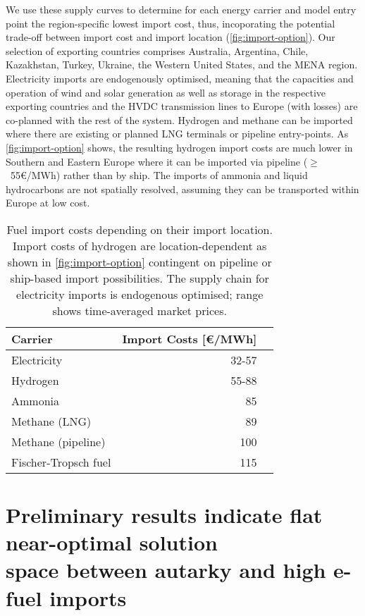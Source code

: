 \documentclass[10pt,5p,reversenotenum,lefttitle]{elsarticle}
\begin{document}
We use these supply curves to determine for each energy carrier and model entry
point the region-specific lowest import cost, thus, incoporating the potential
trade-off between import cost and import location (\cref{fig:import-option}).
Our selection of exporting countries comprises Australia, Argentina, Chile,
Kazakhstan, Turkey, Ukraine, the Western United States, and the MENA region.
Electricity imports are endogenously optimised, meaning that the capacities and
operation of wind and solar generation as well as storage in the respective
exporting countries and the HVDC transmission lines to Europe (with losses) are
co-planned with the rest of the system. Hydrogen and methane can be imported
where there are existing or planned LNG terminals or pipeline entry-points. As
\cref{fig:import-option} shows, the resulting hydrogen import costs are much
lower in Southern and Eastern Europe where it can be imported via pipeline
\mbox{($\geq$ 55\euro/MWh)} rather than by ship. The imports of ammonia and
liquid hydrocarbons are not spatially resolved, assuming they can be transported
within Europe at low cost.

\begin{table}
    \centering\small
    \begin{tabular}[pos]{lrr}
        \toprule
        Carrier & Import Costs [\euro/MWh] \\
        \midrule
        Electricity & 32-57 \\
        Hydrogen & 55-88 \\
        Ammonia & 85 \\ 
        Methane (LNG) & 89 \\
        Methane (pipeline) & 100 \\
        Fischer-Tropsch fuel & 115 \\
        \bottomrule
    \end{tabular}
    \caption{Fuel import costs depending on their import location. Import costs
    of hydrogen are location-dependent as shown in \cref{fig:import-option}
    contingent on pipeline or ship-based import possibilities. The supply chain
    for electricity imports is endogenous optimised; range shows time-averaged
    market prices.}
    \label{tab:costs}
\end{table}

\section*{Preliminary results indicate flat near-optimal solution\\space between autarky and high e-fuel imports}
\end{document}
